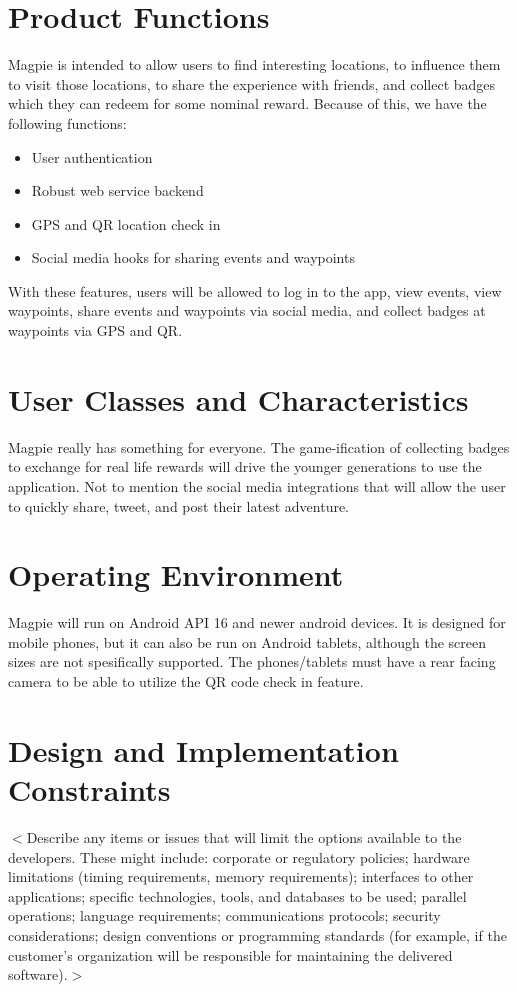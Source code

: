 \documentclass{scrreprt}
\begin{document}
\section{Product Functions}
Magpie is intended to allow users to find interesting locations, to influence them
to visit those locations, to share the experience with friends, and collect badges
which they can redeem for some nominal reward. Because of this, we have the
following functions:
\begin{itemize}
\item User authentication
\item Robust web service backend
\item GPS and QR location check in
\item Social media hooks for sharing events and waypoints
\end{itemize}
With these features, users will be allowed to log in to the app, view events,
view waypoints, share events and waypoints via social media, and collect
badges at waypoints via GPS and QR.

\section{User Classes and Characteristics}
Magpie really has something for everyone. The game-ification of collecting badges to
exchange for real life rewards will drive the younger generations to use the application.
Not to mention the social media integrations that will allow the user to quickly share, tweet, and
post their latest adventure.

\section{Operating Environment}
Magpie will run on Android API 16 and newer android devices. It is designed for
mobile phones, but it can also be run on Android tablets, although the screen
sizes are not spesifically supported. The phones/tablets must have a rear facing
camera to be able to utilize the QR code check in feature.

\section{Design and Implementation Constraints}
$<$Describe any items or issues that will limit the options available to the
developers. These might include: corporate or regulatory policies; hardware
limitations (timing requirements, memory requirements); interfaces to other
applications; specific technologies, tools, and databases to be used; parallel
operations; language requirements; communications protocols; security
considerations; design conventions or programming standards (for example, if the
customer's organization will be responsible for maintaining the delivered
software).$>$
\end{document}

